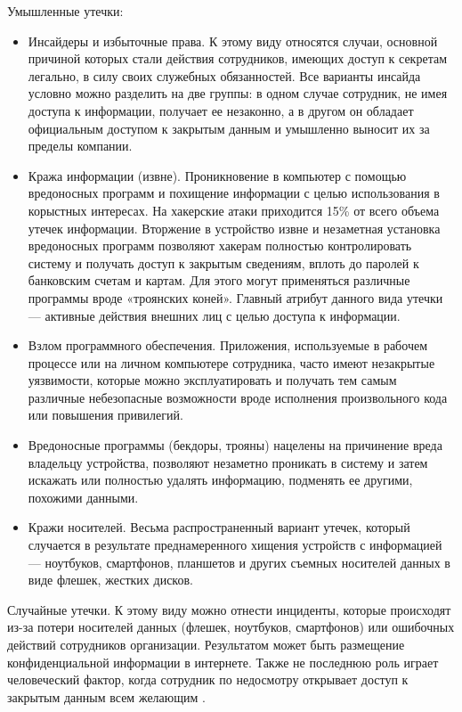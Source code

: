 Умышленные утечки:
\begin{itemize}
    \item Инсайдеры и избыточные права. К этому виду относятся случаи, основной причиной которых
        стали действия сотрудников, имеющих доступ к секретам легально, в силу своих служебных
        обязанностей. Все варианты инсайда условно можно разделить на две группы: в одном случае
        сотрудник, не имея доступа к информации, получает ее незаконно, а в другом он обладает
        официальным доступом к закрытым данным и умышленно выносит их за пределы компании.
    \item Кража информации (извне). Проникновение в компьютер с помощью вредоносных программ и
        похищение информации с целью использования в корыстных интересах. На хакерские атаки
        приходится 15\% от всего объема утечек информации. Вторжение в устройство извне и
        незаметная установка вредоносных программ позволяют хакерам полностью контролировать
        систему и получать доступ к закрытым сведениям, вплоть до паролей к банковским счетам и
        картам. Для этого могут применяться различные программы вроде «троянских коней». Главный
        атрибут данного вида утечки — активные действия внешних лиц с целью доступа к информации.
    \item Взлом программного обеспечения. Приложения, используемые в рабочем процессе или на личном
        компьютере сотрудника, часто имеют незакрытые уязвимости, которые можно эксплуатировать и
        получать тем самым различные небезопасные возможности вроде исполнения произвольного кода или
        повышения привилегий.
    \item Вредоносные программы (бекдоры, трояны) нацелены на причинение вреда владельцу устройства,
        позволяют незаметно проникать в систему и затем искажать или полностью удалять информацию,
        подменять ее другими,  похожими данными.
    \item Кражи носителей. Весьма распространенный вариант утечек, который случается в результате
        преднамеренного хищения устройств с информацией — ноутбуков, смартфонов, планшетов и других
        съемных носителей данных в виде флешек, жестких дисков.
\end{itemize}

Случайные утечки. К этому виду можно отнести инциденты, которые происходят из-за потери носителей
данных (флешек, ноутбуков, смартфонов) или ошибочных действий сотрудников организации. Результатом
может быть размещение конфиденциальной информации в интернете. Также не последнюю роль играет
человеческий фактор, когда сотрудник по недосмотру открывает доступ к закрытым данным всем желающим \cite{leaks}.

